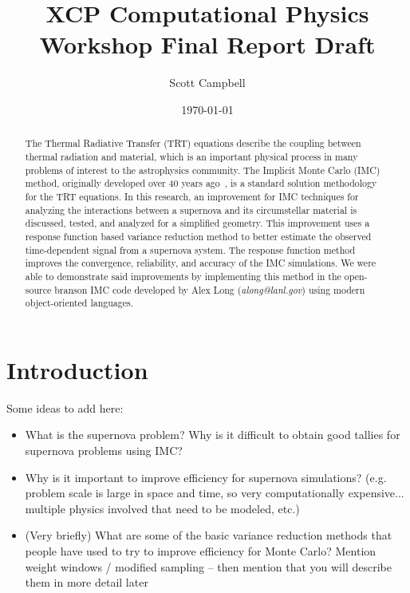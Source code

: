 \documentclass[]{article}
\begin{document}
	\title{XCP Computational Physics Workshop Final Report Draft}
	\author{Scott Campbell}
	\date{\today}
	
	\maketitle

\begin{abstract}
	The Thermal Radiative Transfer (TRT) equations describe the coupling between thermal radiation and material, which is an important physical process in many problems of interest to the astrophysics community. The Implicit Monte Carlo (IMC) method, originally developed over 40 years ago~\cite{FC71}, is a standard solution methodology for the TRT equations. In this research, an improvement for IMC techniques for analyzing the interactions between a supernova and its circumstellar material is discussed, tested, and analyzed for a simplified geometry. This improvement uses a response function based variance reduction method to better estimate the observed time-dependent signal from a supernova system. The response function method improves the convergence, reliability, and accuracy of the IMC simulations. We were able to demonstrate said improvements by implementing this method in the open-source branson IMC code developed by Alex Long (\textit{along@lanl.gov}) using modern object-oriented languages.
\end{abstract}

\newpage

\section{Introduction}
  	Some ideas to add here:
  	\begin{itemize}
	    \item What is the supernova problem? Why is it difficult to obtain good tallies for supernova problems using IMC?
	    \item Why is it important to improve efficiency for supernova simulations? (e.g. problem scale is large in space and time, so very computationally expensive... multiple physics involved that need to be modeled, etc.)
	    \item (Very briefly) What are some of the basic variance reduction methods that people have used to try to improve efficiency for Monte Carlo? Mention weight windows / modified sampling -- then mention that you will describe them in more detail later
  	\end{itemize}
\end{document}
